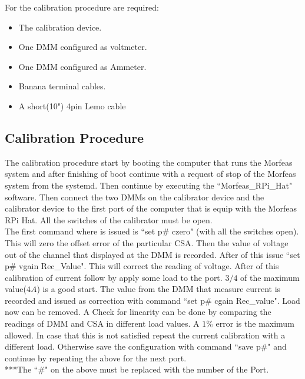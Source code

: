 For the calibration procedure are required:
\begin{itemize}
	\item The calibration device.
	\item One DMM configured as voltmeter.
	\item One DMM configured as Ammeter.
	\item Banana terminal cables.
	\item A short(10") 4pin Lemo cable
\end{itemize}
\newpage
\subsection{Calibration Procedure}
The calibration procedure start by booting the computer that runs the Morfeas system and after finishing of boot continue with a request of stop of the Morfeas system from the systemd.
Then continue by executing the ``Morfeas\_RPi\_Hat" software. Then connect the two DMMs on the calibrator device and the calibrator device to the first port of the computer that is equip with the Morfeas RPi Hat.
All the switches of the calibrator must be open.\\
The first command where is issued is ``set p\# czero" (with all the switches open). This will zero the offset error of the particular CSA. Then the value of voltage out of the channel that displayed
at the DMM is recorded. After of this issue ``set p\# vgain Rec\_Value". This will correct the reading of voltage. After of this calibration of current follow by apply some load to the port.
$3/4$ of the maximum value($4A$) is a good start. The value from the DMM that measure current is recorded and issued as correction with command ``set p\# cgain Rec\_value".
Load now can be removed. A Check for linearity can be done by comparing the readings of DMM and CSA in different load values. A $1\%$ error is the maximum allowed.
In case that this is not satisfied repeat the current calibration with a different load. Otherwise save the configuration with command ``save p\#" and continue by repeating the above for the next port.\\
***The ``\#" on the above must be replaced with the number of the Port.\\

